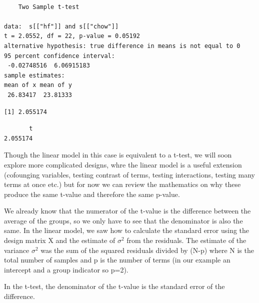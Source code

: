 \documentclass[
  letterpaper,
  DIV=11,
  numbers=noendperiod]{scrartcl}
\newenvironment{Shaded}{\begin{snugshade}}{\end{snugshade}}
\newcommand{\DecValTok}[1]{\textcolor[rgb]{0.68,0.00,0.00}{#1}}
\newcommand{\FunctionTok}[1]{\textcolor[rgb]{0.28,0.35,0.67}{#1}}
\newcommand{\NormalTok}[1]{\textcolor[rgb]{0.00,0.23,0.31}{#1}}
\newcommand{\SpecialCharTok}[1]{\textcolor[rgb]{0.37,0.37,0.37}{#1}}
\begin{document}
\begin{verbatim}

    Two Sample t-test

data:  s[["hf"]] and s[["chow"]]
t = 2.0552, df = 22, p-value = 0.05192
alternative hypothesis: true difference in means is not equal to 0
95 percent confidence interval:
 -0.02748516  6.06915183
sample estimates:
mean of x mean of y 
 26.83417  23.81333 
\end{verbatim}

\begin{Shaded}
\end{Shaded}

\begin{verbatim}
[1] 2.055174
\end{verbatim}

\begin{Shaded}
\end{Shaded}

\begin{verbatim}
       t 
2.055174 
\end{verbatim}

Though the linear model in this case is equivalent to a t-test, we will
soon explore more complicated designs, whre the linear model is a useful
extension (cofounging variables, testing contrast of terms, testing
interactions, testing many terms at once etc.) but for now we can review
the mathematics on why these produce the same t-value and therefore the
same p-value.

We already know that the numerator of the t-value is the difference
between the average of the groups, so we only have to see that the
denominator is also the same. In the linear model, we saw how to
calculate the standard error using the design matrix X and the estimate
of \(\sigma^2\) from the residuals. The estimate of the variance
\(\sigma^2\) was the sum of the squared residuals divided by (N-p) where
N is the total number of samples and p is the number of terms (in our
example an intercept and a group indicator so p=2).

In the t-test, the denominator of the t-value is the standard error of
the difference.
\end{document}
